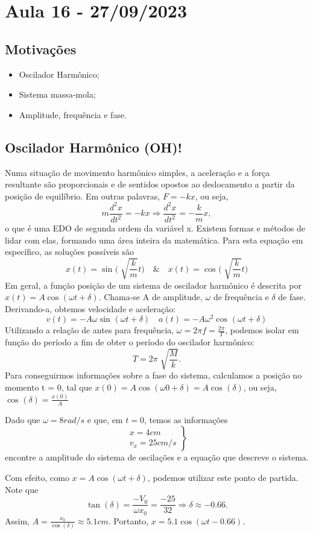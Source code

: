 \documentclass[physicsII_notes.tex]{subfiles}
\begin{document}
\section{Aula 16 - 27/09/2023}
\subsection{Motivações}
\begin{itemize}
	\item Oscilador Harmônico;
	\item Sistema massa-mola;
	\item Amplitude, frequência e fase.
\end{itemize}
\subsection{Oscilador Harmônico (OH)!}
Numa situação de movimento harmônico simples, a aceleração e a força resultante são
proporcionais e de sentidos opostos ao deslocamento a partir da posição de equilíbrio.
Em outras palavras, \(F = -kx\), ou seja,
\[
	m\frac{d^{2}x}{dt^{2}}=-kx \Rightarrow \frac{d^{2}x}{dt^{2}}=-\frac{k}{m}x,
\]
o que é uma EDO de segunda ordem da variável x. Existem formas e métodos de lidar com elas,
formando uma área inteira da matemática. Para esta equação em específico, as soluções possíveis são
\[
	x(t)=\sin^{}{\biggl(\sqrt[]{\frac{k}{m}}t\biggr)} \quad\&\quad x(t)=\cos^{}{\biggl(\sqrt[]{\frac{k}{m}}t\biggr)}
\]
Em geral, a função posição de um sistema de oscilador harmônico é descrita por \(x(t) = A\cos^{}{(\omega t + \delta )}.\)
Chama-se A de amplitude, \(\omega \) de frequência e \(\delta \) de fase. Derivando-a, obtemos velocidade
e aceleração:
\[
	v(t) = -A\omega \sin^{}{(\omega t + \delta )}\quad a(t) = -A\omega^{2}\cos^{}{(\omega t + \delta )}
\]
Utilizando a relação de antes para frequência, \(\omega = 2\pi f = \frac{2\pi }{T}\), podemos
isolar em função do período a fim de obter o período do oscilador harmônico:
\[
	T = 2\pi \sqrt[]{\frac{M}{k}}.
\]
Para conseguirmos informações sobre a fase do sistema, calculamos a posição no momento t = 0, tal que
\(x(0) = A\cos^{}{(\omega 0 + \delta )} = A\cos^{}{(\delta )}\), ou seja, \(\cos^{}{(\delta )}=\frac{x(0)}{A}\)
\begin{example}
	Dado que \(\omega = 8 rad/s\) e que, em \(t=0\), temos as informações
	\[
		\left.\begin{array}{ll}
			x=4cm \\
			v_{x} = 25 cm/s
		\end{array}\right\}
	\]
	encontre a amplitude do sistema de oscilações e a equação que descreve o sistema.

	Com efeito, como \(x = A \cos{(\omega t + \delta )}\), podemos utilizar este ponto de partida. Note que
	\[
		\tan{(\delta )} = \frac{-V_{0}}{\omega x_{0}} = \frac{-25}{32} \Rightarrow \delta \approx -0.66.
	\]
	Assim, \(A = \frac{x_{0}}{\cos{(\delta )}}\approx 5.1cm\). Portanto, \(x = 5.1\cos{(\omega t - 0.66)}.\)
\end{example}
\end{document}

